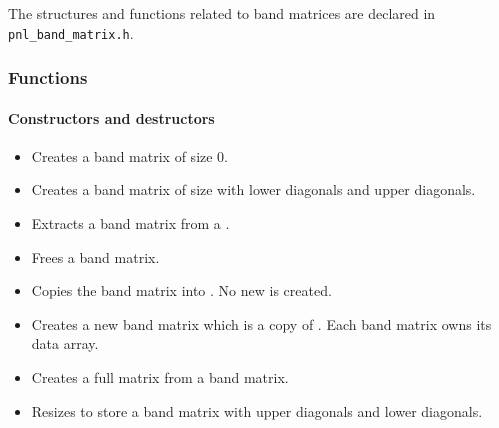 The structures and functions related to band matrices are declared in
\verb!pnl_band_matrix.h!. 


\subsubsection{Functions}
\paragraph{Constructors and destructors}
\begin{itemize}
  \item {}
  \sshortdescribe Creates a band matrix of size 0.

\item {}
  \sshortdescribe Creates a band matrix of size  with  lower
  diagonals and  upper diagonals.

\item {}
  \sshortdescribe Extracts a band matrix from a .

\item {}
  \sshortdescribe Frees a band matrix.

\item {}
  \sshortdescribe Copies the band matrix  into . No new
   is created.

\item {}
  \sshortdescribe Creates a new band matrix which is a copy of . Each
  band matrix owns its data array.

\item {}
  \sshortdescribe Creates a full matrix from a band matrix.

\item {}
  \sshortdescribe Resizes  to store a  band matrix with
   upper diagonals and  lower diagonals.
\end{itemize}
